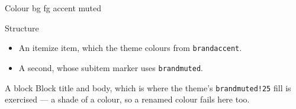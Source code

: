 \documentclass{beamer}
\begin{document}
\begin{frame}{Colour}
  {\color{brandbg}bg}\quad
  {\color{brandfg}fg}\quad
  {\color{brandaccent}accent}\quad
  {\color{brandmuted}muted}
\end{frame}

\begin{frame}{Structure}
  \begin{itemize}
    \item An itemize item, which the theme colours from \texttt{brandaccent}.
    \item A second, whose subitem marker uses \texttt{brandmuted}.
  \end{itemize}
  \begin{block}{A block}
    Block title and body, which is where the theme's \texttt{brandmuted!25} fill
    is exercised — a shade of a colour, so a renamed colour fails here too.
  \end{block}
\end{frame}
\end{document}

